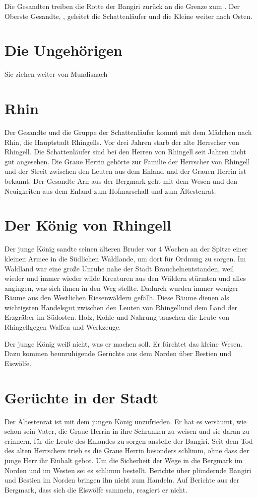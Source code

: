\documentclass[12pt,a4paper,onecolumn,twoside,ngerman]{book}
\newcommand{\Rhingell}{Rhingell}
\newcommand{\Mundis}{Mundis}
\newcommand{\Braucheln}{Braucheln}
\begin{document}
Die Gesandten treiben die Rotte der Bangiri zurück an die Grenze zum \Enland. Der Oberste Gesandte, \Arn, geleitet die Schattenläufer und die Kleine weiter nach Osten.

\section{Die Ungehörigen}

Sie ziehen weiter von \Mundis nach \Helim

\section{Rhin}

Der Gesandte und die Gruppe der Schattenläufer kommt mit dem Mädchen nach Rhin, die Hauptstadt Rhingells. Vor drei Jahren starb der alte Herrscher von Rhingell. Die Schattenläufer sind bei den Herren von Rhingell seit Jahren nicht gut angesehen. Die Graue Herrin gehörte zur Familie der Herrscher von Rhingell und der Streit zwischen den Leuten aus dem Enland und der Grauen Herrin ist bekannt. Der Gesandte Arn aus der Bergmark geht mit dem Wesen und den Neuigkeiten aus dem Enland zum Hofmarschall und zum Ältestenrat.

\section{Der König von Rhingell}
Der junge König sandte seinen älteren Bruder vor 4 Wochen an der Spitze einer kleinen Armee in die Südlichen Waldlande, um dort für Ordnung zu sorgen. Im Waldland war eine große Unruhe nahe der Stadt \Braucheln entstanden, weil wieder und immer wieder wilde Kreaturen aus den Wäldern stürmten und alles angingen, was sich ihnen in den Weg stellte. Dadurch wurden immer weniger Bäume aus den Westlichen Riesenwäldern gefällt. Diese Bäume dienen als wichtigsten Handelsgut zwischen den Leuten von \Rhingell und dem Land der Erzgräber im Südosten. Holz, Kohle und Nahrung tauschen die Leute von \Rhingell gegen Waffen und Werkzeuge.

Der junge König weiß nicht, was er machen soll. Er fürchtet das kleine Wesen. Dazu kommen beunruhigende Gerüchte aus dem Norden über Bestien und Eiswölfe. 

\section{Gerüchte in der Stadt}
Der Ältestenrat ist mit dem jungen König unzufrieden. Er hat es versäumt, wie schon sein Vater, die Graue Herrin in ihre Schranken zu weisen und sie daran zu erinnern, für die Leute des Enlandes zu sorgen anstelle der Bangiri. Seit dem Tod des alten Herrschers trieb es die Graue Herrin besonders schlimm, ohne dass der junge Herr ihr Einhalt gebot. Um die Sicherheit der Wege in die Bergmark im Norden und im Westen sei es schlimm bestellt. Berichte über plündernde Bangiri und Bestien im Norden bringen ihn nicht zum Handeln. Auf Berichte aus der Bergmark, dass sich die Eiswölfe sammeln, reagiert er nicht.
\end{document}

